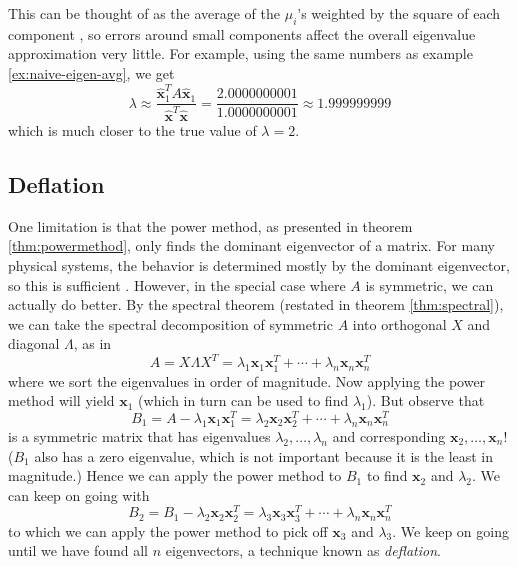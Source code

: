 \documentclass{article}
\let\vec\mathbf
\begin{document}
This can be thought of as the average of the $\mu_i$'s weighted by the square of each component \cite{mit-sensitivity}, so errors around small components affect the overall eigenvalue approximation very little. For example, using the same numbers as example \ref{ex:naive-eigen-avg}, we get
\begin{equation*}
  \lambda \approx \frac{\hat{\vec{x}}_1^T A \hat{\vec{x}}_1}{\hat{\vec{x}}^T\hat{\vec{x}}} = \frac{2.0000000001}{1.0000000001} \approx 1.999999999
\end{equation*}
which is much closer to the true value of $\lambda = 2$.

\subsection{Deflation}
One limitation is that the power method, as presented in theorem \ref{thm:powermethod}, only finds the dominant eigenvector of a matrix. For many physical systems, the behavior is determined mostly by the dominant eigenvector, so this is sufficient \cite{spanish}. However, in the special case where $A$ is symmetric, we can actually do better. By the spectral theorem (restated in theorem \ref{thm:spectral}), we can take the spectral decomposition of symmetric $A$ into orthogonal $X$ and diagonal $\Lambda$, as in
\begin{equation*}
  A = X \Lambda X^T = \lambda_1 \vec{x}_1 \vec{x}_1^T + \cdots + \lambda_n \vec{x}_n \vec{x}_n^T
\end{equation*}
where we sort the eigenvalues in order of magnitude. Now applying the power method will yield $\vec{x}_1$ (which in turn can be used to find $\lambda_1$). But observe that
\begin{equation*}
  B_1 = A - \lambda_1 \vec{x}_1 \vec{x}_1^T = \lambda_2 \vec{x}_2 \vec{x}_2^T + \cdots + \lambda_n \vec{x}_n \vec{x}_n^T
\end{equation*}
is a symmetric matrix that has eigenvalues $\lambda_2, \ldots, \lambda_n$ and corresponding $\vec{x}_2, \ldots, \vec{x}_n$! ($B_1$ also has a zero eigenvalue, which is not important because it is the least in magnitude.) Hence we can apply the power method to $B_1$ to find $\vec{x}_2$ and $\lambda_2$. We can keep on going with
\begin{equation*}
  B_2 = B_1 - \lambda_2 \vec{x}_2 \vec{x}_2^T = \lambda_3 \vec{x}_3 \vec{x}_3^T + \cdots + \lambda_n \vec{x}_n \vec{x}_n^T
\end{equation*}
to which we can apply the power method to pick off $\vec{x}_3$ and $\lambda_3$. We keep on going until we have found all $n$ eigenvectors, a technique known as \textit{deflation}.
\end{document}

